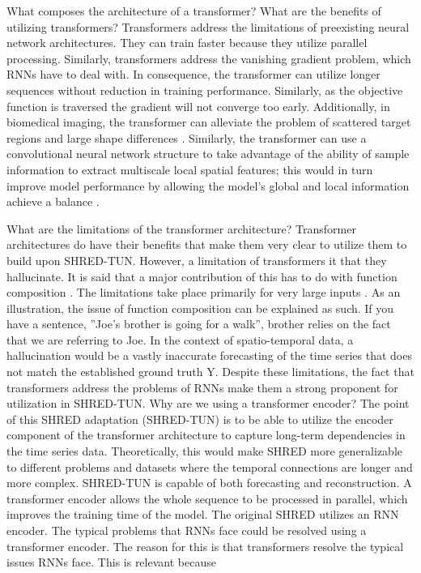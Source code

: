 \documentclass[11pt, a4paper]{article}
\begin{document}
What composes the architecture of a transformer?
What are the benefits of utilizing transformers? Transformers address the limitations of preexisting neural
network architectures. They can train faster because they utilize parallel processing. Similarly, transformers
address the vanishing gradient problem, which RNNs have to deal with. In consequence, the transformer can
utilize longer sequences without reduction in training performance. Similarly, as the objective function is
traversed the gradient will not converge too early. Additionally, in biomedical imaging, the transformer can
alleviate the problem of scattered target regions and large shape differences \cite{article}. Similarly, the transformer
can use a convolutional neural network structure to take advantage of the ability of sample information
to extract multiscale local spatial features; this would in turn improve model performance by allowing the
model’s global and local information achieve a balance \cite{article}.

What are the limitations of the transformer architecture? Transformer architectures do have their benefits
that make them very clear to utilize them to build upon SHRED-TUN. However, a limitation of transformers
it that they hallucinate. It is said that a major contribution of this has to do with function composition
\cite{peng2024limitationstransformerarchitecture}. The limitations take place primarily for very large inputs \cite{peng2024limitationstransformerarchitecture}. As an illustration, the issue of function
composition can be explained as such. If you have a sentence, ”Joe’s brother is going for a walk”, brother
relies on the fact that we are referring to Joe. In the context of spatio-temporal data, a hallucination would
be a vastly inaccurate forecasting of the time series that does not match the established ground truth
Y. Despite these limitations, the fact that transformers address the problems of RNNs make them a strong
proponent for utilization in SHRED-TUN.
Why are we using a transformer encoder? The point of this SHRED adaptation (SHRED-TUN) is to be
able to utilize the encoder component of the transformer architecture to capture long-term dependencies in
the time series data. Theoretically, this would make SHRED more generalizable to different problems and
datasets where the temporal connections are longer and more complex. SHRED-TUN is capable of both
forecasting and reconstruction. A transformer encoder allows the whole sequence to be processed in parallel,
which improves the training time of the model. The original SHRED utilizes an RNN encoder. The typical
problems that RNNs face could be resolved using a transformer encoder. The reason for this is that
transformers resolve the typical issues RNNs face. This is relevant because
\end{document}
